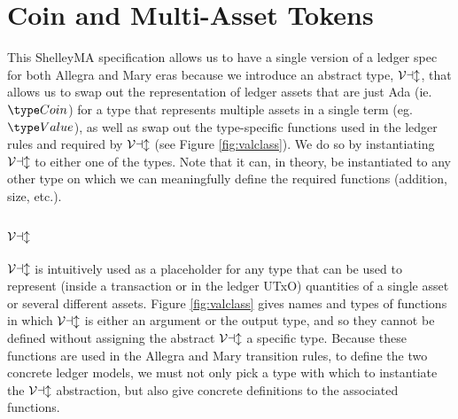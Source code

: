 \section{Coin and Multi-Asset Tokens}
\label{sec:coin-ma}

This ShelleyMA specification allows us to have a single version of a ledger
spec for both Allegra and Mary eras because we introduce an abstract type,
$\mathcal{Val}$, that allows us to swap out the representation of ledger assets that
are just Ada (ie. $\Coin$) for a type that represents multiple assets in a
single term (eg. $\Value$), as well as swap out the type-specific functions
used in the ledger rules and required by $\mathcal{Val}$ (see Figure \ref{fig:valclass}).
We do so by instantiating $\mathcal{Val}$ to either one of the types. Note that
it can, in theory, be instantiated to any other type on which we can meaningfully
define the required functions (addition, size, etc.).

\subsection{$\mathcal{Val}$}

$\mathcal{Val}$ is intuitively used as a placeholder for any type that can be used
to represent (inside a transaction or in the ledger UTxO) quantities of a single asset or several different assets.
Figure \ref{fig:valclass} gives names and types of functions in which $\mathcal{Val}$ is either
an argument or the output type, and so they cannot be defined without assigning
the abstract $\mathcal{Val}$ a specific type. Because these functions are used in the
Allegra and Mary transition rules, to define the two concrete ledger models,
we must not only pick a type with which to instantiate the $\mathcal{Val}$ abstraction,
but also give concrete definitions to the associated functions.



